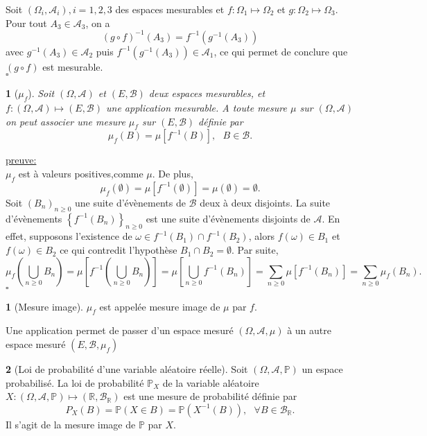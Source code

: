 \documentclass[8pt,notheorems]{beamer}
\def \R{\mathbb R}
\def \Om{\Omega}
\def \P {\mathbb P}
\newtheorem{theorem}{\translate{Theorem}}[section]
\newtheorem{theorem}{\translate{Theoreme}}
\theoremstyle{definition}
\newtheorem{definition}{\translate{Definition}}
\theoremstyle{example}
\theoremstyle{mystyle}
\theoremstyle{plain}
\begin{document}
\begin{frame}[allowframebreaks]
Soit $(\Om_i,\mathcal{A}_i),i=1,2,3$ des espaces mesurables et $f:\Om_1\mapsto \Om_2$ et $g:\Om_2\mapsto \Om_3$. Pour tout $A_3\in\mathcal{A}_3$, on a
$$
(g\circ f)^{-1}(A_3)=f^{-1}(g^{-1}(A_3))
$$
avec $g^{-1}(A_3)\in\mathcal{A}_2$ puis $f^{-1}(g^{-1}(A_3))\in\mathcal{A}_1$, ce qui permet de conclure que $(g\circ f)$ est mesurable.\\
$\square$
\begin{theorem}[$\mu_f$]\label{theo:mesure_image}
Soit $(\Omega,\mathcal{A})$ et $(E,\mathcal{B})$ deux espaces mesurables, et $f:(\Omega,\mathcal{A})\mapsto (E,\mathcal{B})$ une application mesurable. A toute mesure $\mu$ sur $(\Omega,\mathcal{A})$ on peut associer une mesure $\mu_f$ sur $(E, \mathcal{B})$ définie par 
$$
\mu_f(B) = \mu\left[f^{-1}(B)\right],\text{ }B\in\mathcal{B}.
$$
\end{theorem}
\underline{preuve:}\\
$\mu_f$ est à valeurs positives,comme $\mu$. De plus, 
$$
\mu_f(\emptyset) = \mu\left[f^{-1}(\emptyset)\right] = \mu(\emptyset) = \emptyset.
$$ 
Soit $(B_n)_{n\geq 0}$ une suite d'évènements de $\mathcal{B}$ deux à deux disjoints. La suite d'évènements $\left\{f^{-1}(B_n)\right\}_{n\geq 0}$ est une suite d'évènements disjoints de $\mathcal{A}$. En effet, supposons l'existence de $\omega\in f^{-1}(B_1)\cap f^{-1}(B_2)$, alors $f(\omega)\in B_1$ et $f(\omega)\in B_2$ ce qui contredit l'hypothèse $B_1\cap B_2 =\emptyset$. Par suite,
$$
\mu_f\left(\bigcup_{n\geq0}B_n\right) = \mu\left[f^{-1}\left(\bigcup_{n\geq0}B_n\right)\right] =\mu\left[\bigcup_{n\geq0}f^{-1}\left(B_n\right)\right] = \sum_{n\geq0}\mu\left[f^{-1}\left(B_n\right)\right]=\sum_{n\geq0}\mu_f\left(B_n\right).
$$
$\square$
\begin{definition}[Mesure image]
$\mu_f$ est appelée mesure image de $\mu$ par $f$.
\end{definition}
Une application permet de passer d'un espace mesuré $(\Omega,\mathcal{A}, \mu)$ à un autre espace mesuré $(E,\mathcal{B},\mu_f)$
\begin{definition}[Loi de probabilité d'une variable aléatoire réelle]
Soit $(\Omega, \mathcal{A}, \P)$ un espace probabilisé. La loi de probabilité $\P_X$ de la variable aléatoire $X:(\Omega, \mathcal{A},\P)\mapsto(\R,\mathcal{B}_\R)$ est une mesure de probabilité définie par 
$$
P_X(B) = \P(X\in B) = \P(X^{-1}(B)),\text{ }\forall B\in\mathcal{B}_\R. 
$$
Il s'agit de la mesure image de $\P$ par $X$.
\end{definition}
\end{frame}
\end{document}
